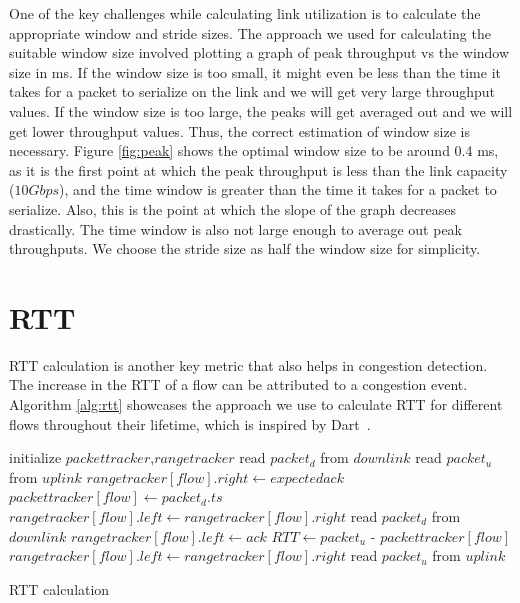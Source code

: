 One of the key challenges while calculating link utilization is to calculate the appropriate window and stride sizes. The approach we used for calculating the suitable window size involved plotting a graph of peak throughput vs the window size in ms. If the window size is too small, it might even be less than the time it takes for a packet to serialize on the link and we will get very large throughput values. If the window size is too large, the peaks will get averaged out and we will get lower throughput values. Thus, the correct estimation of window size is necessary. Figure \ref{fig:peak} shows the optimal window size to be around 0.4 ms, as it is the first point at which the peak throughput is less than the link capacity ($10 Gbps$), and the time window is greater than the time it takes for a packet to serialize. Also, this is the point at which the slope of the graph decreases drastically. The time window is also not large enough to average out peak throughputs. We choose the stride size as half the window size for simplicity.

\section{RTT}

RTT calculation is another key metric that also helps in congestion detection. The increase in the RTT of a flow can be attributed to a congestion event. Algorithm \ref{alg:rtt} showcases the approach we use to calculate RTT for different flows throughout their lifetime, which is inspired by Dart~\cite{dart-sigcomm22}.

\begin{algorithm}[ttpb]
\bigskip
\begin{algorithmic}
\State initialize $packettracker$,$rangetracker$ 
\State read $packet_d$ from $downlink$
\State read $packet_u$ from $uplink$
        \State $rangetracker[flow].right \gets expectedack$
        \State $packettracker[flow] \gets packet_d.ts$
    \Else 
        \State $rangetracker[flow].left \gets rangetracker[flow].right$
    \EndIf
    \State read $packet_d$ from $downlink$
\Else
        \State $rangetracker[flow].left \gets ack$
        \State $RTT \gets packet_u$ - $packettracker[flow]$
        \State  $rangetracker[flow].left \gets rangetracker[flow].right$
    \EndIf
    \State read $packet_u$ from $uplink$
\EndIf
\EndWhile
\end{algorithmic}
\caption[RTT calculation]{RTT calculation}
\label{alg:rtt}
\bigskip
\end{algorithm}

